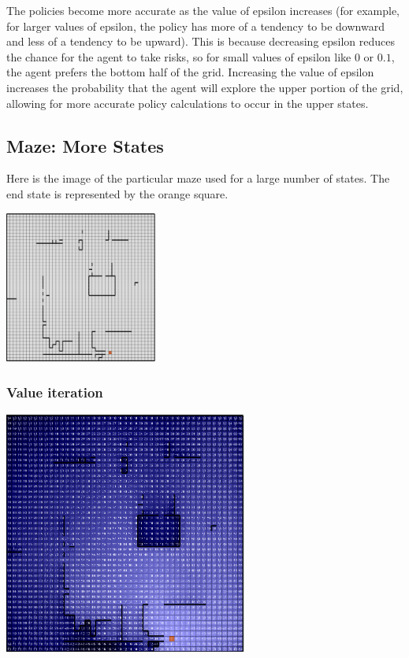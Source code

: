 \documentclass[11pt]{article}
\begin{document}
            The policies become more accurate as the value of epsilon increases
            (for example, for larger values of epsilon, the policy has more
            of a tendency to be downward and less of a tendency to
            be upward).
            This is because
            decreasing epsilon reduces the chance for the agent to take risks,
            so for small values of epsilon like $0$ or $0.1$, the agent prefers
            the bottom half of the grid. Increasing the value of epsilon increases
            the probability that the agent will explore the upper portion of the
            grid, allowing for more accurate policy calculations to occur in the upper
            states.

        \subsection{Maze: More States}

            Here is the image of the particular maze used for a large
            number of states. The end state is represented by the orange square.

            \includegraphics[width=5cm]{../images/large/maze.PNG}
            

            \subsubsection{Value iteration}

            \includegraphics[width=8cm]{../images/large/vi.PNG}
\end{document}
